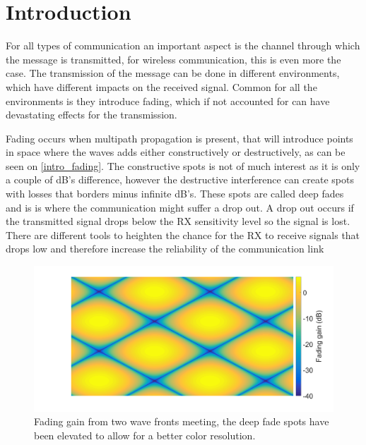 \chapter{Introduction}

%

For all types of communication an important aspect is the channel through which the message is transmitted, for wireless communication, this is even more the case. The transmission of the message can be done in different environments, which have different impacts on the received signal. Common for all the environments is they introduce fading, which if not accounted for can have devastating effects for the transmission. 

Fading occurs when multipath propagation is present, that will introduce points in space where the waves adds either constructively or destructively, as can be seen on \autoref{intro_fading}. The constructive spots is not of much interest as it is only a couple of dB's difference, however the destructive interference can create spots with losses that borders minus infinite dB's. These spots are called deep fades and is is where the communication might suffer a drop out. A drop out occurs if the transmitted signal drops below the RX sensitivity level so the signal is lost. There are different tools to heighten the chance for the RX to receive signals that drops low and therefore increase the reliability of the communication link


\begin{figure}[H]
\centering
\includegraphics[width=\textwidth]{figures/intro_fading.png}
\caption{Fading gain from two wave fronts meeting, the deep fade spots have been elevated to allow for a better color resolution.}
\label{intro_fading}
\end{figure}

